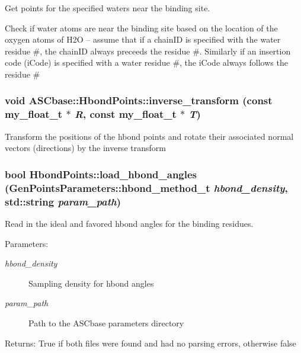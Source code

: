Get points for the specified waters near the binding site. 

Check if water atoms are near the binding site based on the location of the oxygen atoms of H2O -- assume that if a chain\-ID is specified with the water residue \#, the chain\-ID always preceeds the residue \#. Similarly if an insertion code (i\-Code) is specified with a water residue \#, the i\-Code always follows the residue \# 
\subsubsection{\setlength{\rightskip}{0pt plus 5cm}void ASCbase::Hbond\-Points::inverse\_\-transform (const my\_\-float\_\-t $\ast$ {\em R}, const my\_\-float\_\-t $\ast$ {\em T})\hspace{0.3cm}{\tt  [inline]}}\label{classASCbase_1_1HbondPoints_f9c02371e09065fb1099aa0a0921b4c4}


Transform the positions of the hbond points and rotate their associated normal vectors (directions) by the inverse transform 
\subsubsection{\setlength{\rightskip}{0pt plus 5cm}bool Hbond\-Points::load\_\-hbond\_\-angles (\bf{Gen\-Points\-Parameters::hbond\_\-method\_\-t} {\em hbond\_\-density}, std::string {\em param\_\-path})\hspace{0.3cm}{\tt  [private]}}\label{classASCbase_1_1HbondPoints_9c96fe73b65271a49aebf9e4f17fc787}


Read in the ideal and favored hbond angles for the binding residues. 

\begin{Desc}
\item[Parameters:]
\begin{description}
\item[{\em hbond\_\-density}]Sampling density for hbond angles \item[{\em param\_\-path}]Path to the ASCbase parameters directory \end{description}
\end{Desc}
\begin{Desc}
\item[Returns:]True if both files were found and had no parsing errors, otherwise false \end{Desc}
